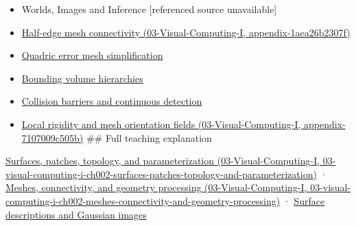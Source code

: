 \begin{itemize}
\item
  {Worlds, Images and Inference {[}referenced source unavailable{]}}
\item
  \href{../03-Visual-Computing-I/main.pdf\#nameddest=appendix-1aea26b2307f}{Half-edge mesh connectivity (03-Visual-Computing-I, appendix-1aea26b2307f)}
\item
  \hyperref[appendix-1dd4ad54ca57]{Quadric error mesh simplification}
\item
  \hyperref[appendix-0b426c47dd78]{Bounding volume hierarchies}
\item
  \hyperref[appendix-a9ba01fa72a6]{Collision barriers and continuous detection}
\item
  \href{../03-Visual-Computing-I/main.pdf\#nameddest=appendix-7107009c505b}{Local rigidity and mesh orientation fields (03-Visual-Computing-I, appendix-7107009c505b)} \#\# Full teaching explanation
\end{itemize}

\href{../03-Visual-Computing-I/main.pdf\#nameddest=03-visual-computing-i-ch002-surfaces-patches-topology-and-parameterization}{Surfaces, patches, topology, and parameterization (03-Visual-Computing-I, 03-visual-computing-i-ch002-surfaces-patches-topology-and-parameterization)} · \href{../03-Visual-Computing-I/main.pdf\#nameddest=03-visual-computing-i-ch002-meshes-connectivity-and-geometry-processing}{Meshes, connectivity, and geometry processing (03-Visual-Computing-I, 03-visual-computing-i-ch002-meshes-connectivity-and-geometry-processing)} · \hyperref[04-visual-computing-ii-ch032-surface-descriptions-and-gaussian-images]{Surface descriptions and Gaussian images}
